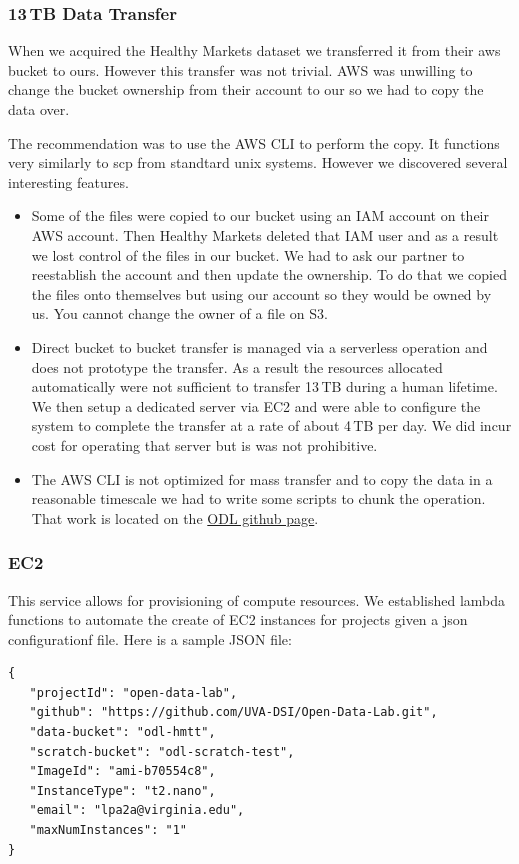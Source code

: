 \subsubsection{13\,TB Data Transfer}
When we acquired the Healthy Markets dataset we transferred it from their aws bucket to ours. However this transfer was not trivial. AWS was unwilling to change the bucket ownership from their account to our so we had to copy the data over.

The recommendation was to use the AWS CLI to perform the copy. It functions very similarly to scp from standtard unix systems. However we discovered several interesting features.
\begin{itemize}
\item Some of the files were copied to our bucket using an IAM account on their AWS account. Then Healthy Markets deleted that IAM user and as a result we lost control of the files in our bucket. We had to ask our partner to reestablish the account and then update the ownership. To do that we copied the files onto themselves but using our account so they would be owned by us. You cannot change the owner of a file on S3.

\item Direct bucket to bucket transfer is managed via a serverless operation and does not prototype the transfer. As a result the resources allocated automatically were not sufficient to transfer 13\,TB during a human lifetime. We then setup a dedicated server via EC2 and were able to configure the system to complete the transfer at a rate of about 4\,TB per day. We did incur cost for operating that server but is was not prohibitive.
\item The AWS CLI is not optimized for mass transfer and to copy the data in a reasonable timescale we had to write some scripts to chunk the operation. That work is located on the \href{https://github.com/UVA-DSI/Open-Data-Lab/tree/master/aws/large_s3_transfer}{ODL github page}.
\end{itemize}

\subsubsection{EC2}
This service allows for provisioning of compute resources. We established lambda functions to automate the create of EC2 instances for projects given a json configurationf file. Here is a sample JSON file:

\begin{verbatim}
{
   "projectId": "open-data-lab",
   "github": "https://github.com/UVA-DSI/Open-Data-Lab.git",
   "data-bucket": "odl-hmtt",
   "scratch-bucket": "odl-scratch-test",
   "ImageId": "ami-b70554c8",
   "InstanceType": "t2.nano",
   "email": "lpa2a@virginia.edu",
   "maxNumInstances": "1"
}
\end{verbatim}

